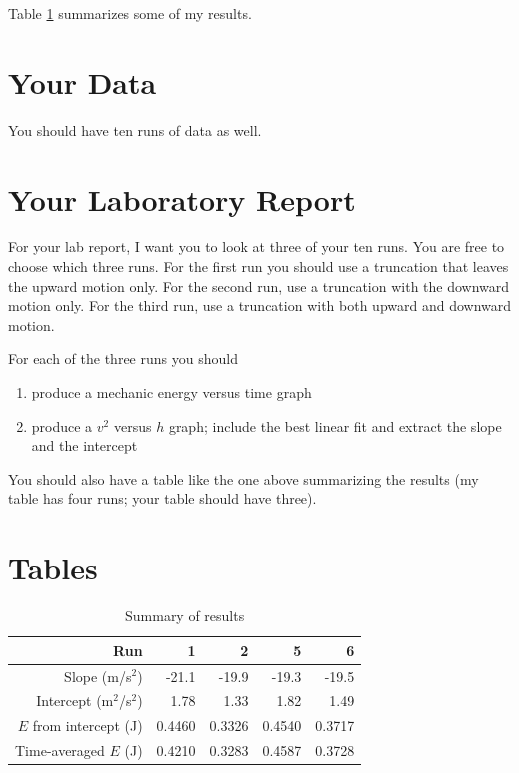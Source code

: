 Table \ref{table.07.results} summarizes some of my results.
\section{Your Data}
You should have ten runs of data as well.
\newpage
\section{Your Laboratory Report}
For your lab report, I want you to look at three of your ten runs. You are free to choose which three runs. For the first run you should use a truncation that leaves the upward motion only. For the second run, use a truncation with the downward motion only. For the third run, use a truncation with both upward and downward motion.

For each of the three runs you should
\begin{enumerate}
    \item produce a mechanic energy versus time graph
    \item produce a $v^{2}$ versus $h$ graph; include the best linear fit and extract the slope and the intercept
\end{enumerate}
You should also have a table like the one above summarizing the results (my table has four runs; your table should have three).
\FloatBarrier
\newpage
\section{Tables}
\begin{table}[ht]
\end{table}
\begin{table}[ht]
	\centering
    \begin{tabular}{|r|r|r|r|r|}\hline
        Run & 1 & 2 & 5 & 6 \\ \hline
        Slope (m/s$^{2}$) & -21.1 & -19.9 & -19.3 & -19.5 \\
        Intercept (m$^{2}$/s$^{2}$) & 1.78 & 1.33 & 1.82 & 1.49 \\
        $E$ from intercept (J) & 0.4460 & 0.3326 & 0.4540 & 0.3717 \\
        Time-averaged $E$ (J) & 0.4210 & 0.3283 & 0.4587 & 0.3728 \\
        \hline
    \end{tabular}
    \caption{Summary of results}
    \label{table.07.results}
\end{table}
\FloatBarrier
\newpage
